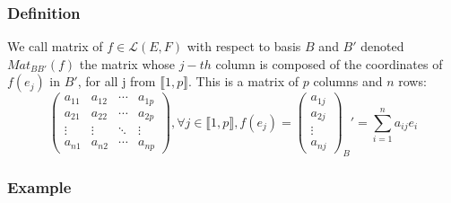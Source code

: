 \documentclass[notitlepage]{math}
\begin{document}
\subsubsection{Definition}
We call matrix of $f \in \mathcal{L}(E,F)$ with respect to basis $B$ and $B'$ denoted $Mat_{BB'}(f)$ the matrix whose $j-th$ column is composed of the coordinates of $f(e_j)$ in $B'$, for all j from $\llbracket 1,p \rrbracket$.
This is a matrix of $p$ columns and $n$ rows:
\[\begin{pmatrix}
    a_{11} & a_{12} & \cdots & a_{1p} \\
    a_{21} & a_{22} & \cdots & a_{2p} \\
    \vdots & \vdots & \ddots & \vdots \\
    a_{n1} & a_{n2} & \cdots & a_{np}
\end{pmatrix}, \forall j \in \llbracket 1,p \rrbracket, f(e_j) = {\begin{pmatrix} a_{1j} \\ a_{2j} \\ \vdots \\ a_{nj} \end{pmatrix}}_B' = \sum_{i=1}^{n} a_{ij} e_i\]
\subsubsection{Example}

     
\end{document}
